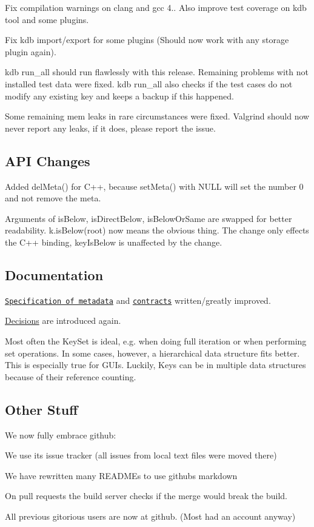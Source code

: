 Fix compilation warnings on clang and gcc 4.. Also improve test coverage on kdb tool and some plugins.

Fix kdb import/export for some plugins (Should now work with any storage plugin again).

kdb run\+\_\+all should run flawlessly with this release. Remaining problems with not installed test data were fixed. kdb run\+\_\+all also checks if the test cases do not modify any existing key and keeps a backup if this happened.

Some remaining mem leaks in rare circumstances were fixed. Valgrind should now never report any leaks, if it does, please report the issue.

\subsection*{A\+PI Changes}

Added del\+Meta() for C++, because set\+Meta() with N\+U\+LL will set the number 0 and not remove the meta.

Arguments of is\+Below, is\+Direct\+Below, is\+Below\+Or\+Same are swapped for better readability. k.\+is\+Below(root) now means the obvious thing. The change only effects the C++ binding, key\+Is\+Below is unaffected by the change.

\subsection*{Documentation}

\href{/home/markus/Projekte/Elektra/current/doc/METADATA.ini}{\tt Specification of metadata} and \href{/home/markus/Projekte/Elektra/current/doc/CONTRACT.ini}{\tt contracts} written/greatly improved.

\hyperlink{doc_decisions_README_md}{Decisions} are introduced again.

Most often the Key\+Set is ideal, e.\+g. when doing full iteration or when performing set operations. In some cases, however, a hierarchical data structure fits better. This is especially true for G\+U\+Is. Luckily, Keys can be in multiple data structures because of their reference counting.

\subsection*{Other Stuff}

We now fully embrace github\+:


\begin{DoxyItemize}
\item We use its issue tracker (all issues from local text files were moved there)
\item We have rewritten many R\+E\+A\+D\+M\+Es to use githubs markdown
\item On pull requests the build server checks if the merge would break the build.
\item All previous gitorious users are now at github. (Most had an account anyway)
\end{DoxyItemize}

